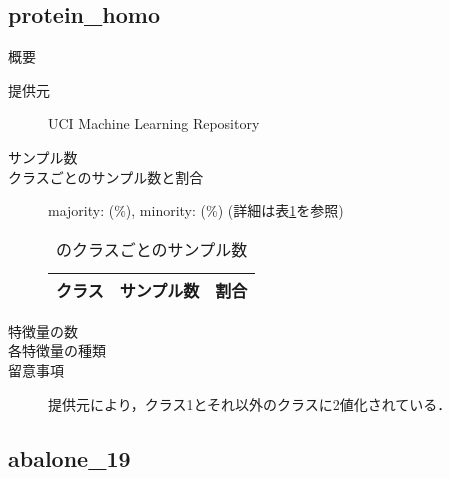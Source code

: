 \subsection{protein\_homo}
\begin{description}
    \item[概要] \cite{}
    \item[提供元] UCI Machine Learning Repository
    \item[サンプル数] 
    \item[クラスごとのサンプル数と割合] majority:  (\%), minority:  (\%) (詳細は表\ref{tab:}を参照)

        \begin{table}
            \centering
            \caption{のクラスごとのサンプル数}
            \label{tab:}
            \begin{tabular}{lrc} \hline
                \multicolumn{1}{c}{クラス}&
                \multicolumn{1}{c}{サンプル数}&
                \multicolumn{1}{c}{割合}\\
                \hline
                \hline

                \hline
            \end{tabular}
        \end{table}

    \item[特徴量の数] 
    \item[各特徴量の種類] \mbox{}
        
    \item[留意事項] 提供元により，クラス1とそれ以外のクラスに2値化されている．
\end{description}

\subsection{abalone\_19}

